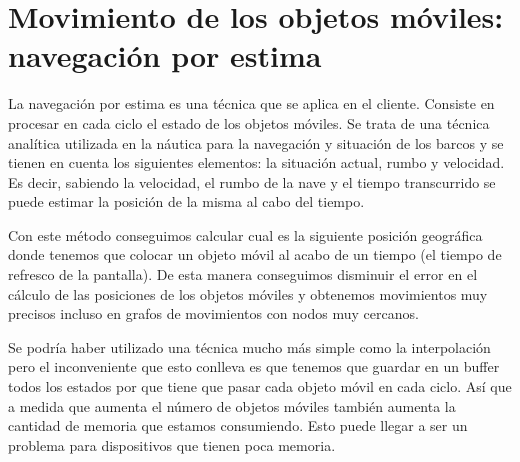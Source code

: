 \newpage

\section{Movimiento de los objetos móviles: navegación por estima}

La navegación por estima es una técnica que se aplica en el cliente. Consiste en procesar en cada ciclo el estado de los objetos móviles. Se trata de una técnica analítica utilizada en la náutica para la navegación y situación de los barcos y se tienen en cuenta los siguientes elementos: la situación actual, rumbo y velocidad. Es decir, sabiendo la velocidad, el rumbo de la nave y el tiempo transcurrido se puede estimar la posición de la misma al cabo del tiempo. 

Con este método conseguimos calcular cual es la siguiente posición geográfica donde tenemos que colocar un objeto móvil al acabo de un tiempo (el tiempo de refresco de la pantalla). De esta manera conseguimos disminuir el error en el cálculo de las posiciones de los objetos móviles y obtenemos movimientos muy precisos incluso en grafos de movimientos con nodos muy cercanos.

Se podría haber utilizado una técnica mucho más simple como la interpolación pero el inconveniente que esto conlleva es que tenemos que guardar en un buffer todos los estados por que tiene que pasar cada objeto móvil en cada ciclo. Así que a medida que aumenta el número de objetos móviles también aumenta la cantidad de memoria que estamos consumiendo. Esto puede llegar a ser un problema para dispositivos que tienen poca memoria. 